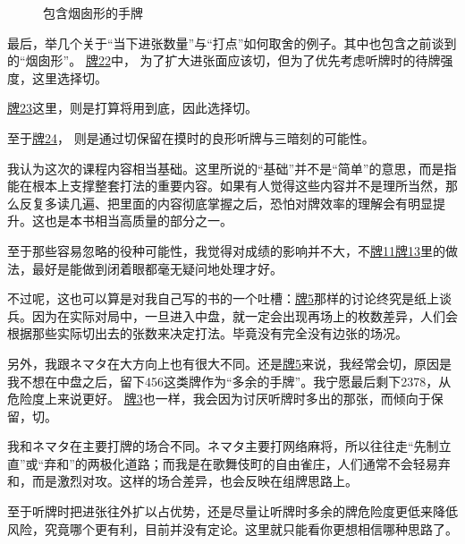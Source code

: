 \par\bigskip
\begin{figure}[h]
    \caption{包含烟囱形的手牌}
    \label{lec7:pai22-24}
    \par\bigskip
    \par\bigskip
\end{figure}
最后，举几个关于“当下进张数量”与“打点”如何取舍的例子。其中也包含之前谈到的“烟囱形”。
\hyperref[lec7:pai22-24]{牌22}中，
为了扩大进张面应该切，但为了优先考虑听牌时的待牌强度，这里选择切。

\hyperref[lec7:pai22-24]{牌23}这里，则是打算将用到底，因此选择切。

至于\hyperref[lec7:pai22-24]{牌24}，
则是通过切保留在摸时的良形听牌与三暗刻的可能性。


\vspace*{\fill}
\begin{tcolorbox}[
    title={福地的碎碎念}, fonttitle=\bfseries\Large
]
我认为这次的课程内容相当基础。这里所说的“基础”并不是“简单”的意思，而是指能在根本上支撑整套打法的重要内容。如果有人觉得这些内容并不是理所当然，那么反复多读几遍、把里面的内容彻底掌握之后，恐怕对牌效率的理解会有明显提升。这也是本书相当高质量的部分之一。

至于那些容易忽略的役种可能性，我觉得对成绩的影响并不大，不\hyperref[lec7:pai11-13]{牌11}\hyperref[lec7:pai11-13]{牌13}里的做法，最好是能做到闭着眼都毫无疑问地处理才好。

不过呢，这也可以算是对我自己写的书的一个吐槽：\hyperref[lec7:pai5-7]{牌5}那样的讨论终究是纸上谈兵。因为在实际对局中，一旦进入中盘，就一定会出现再场上的枚数差异，人们会根据那些实际切出去的张数来决定打法。毕竟没有完全没有边张的场况。

另外，我跟ネマタ在大方向上也有很大不同。还是\hyperref[lec7:pai5-7]{牌5}来说，我经常会切，原因是我不想在中盘之后，留下456这类牌作为“多余的手牌”。我宁愿最后剩下2378，从危险度上来说更好。
\hyperref[lec7:pai3]{牌3}也一样，我会因为讨厌听牌时多出的那张，而倾向于保留，切。

我和ネマタ在主要打牌的场合不同。ネマタ主要打网络麻将，所以往往走“先制立直”或“弃和”的两极化道路；而我是在歌舞伎町的自由雀庄，人们通常不会轻易弃和，而是激烈对攻。这样的场合差异，也会反映在组牌思路上。

至于听牌时把进张往外扩以占优势，还是尽量让听牌时多余的牌危险度更低来降低风险，究竟哪个更有利，目前并没有定论。这里就只能看你更想相信哪种思路了。

\end{tcolorbox}